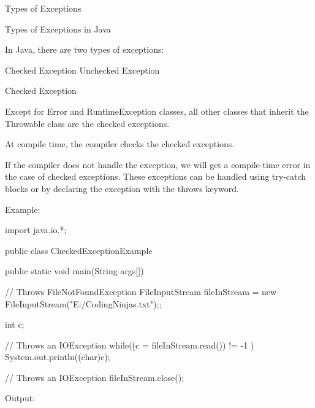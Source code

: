  
 
 Types of Exceptions
 

 

Types of Exceptions in Java
 

In Java, there are two types of exceptions: 

Checked Exception
Unchecked Exception
 

Checked Exception
 

Except for Error and RuntimeException classes, all other classes that inherit the Throwable class are the checked exceptions.

At compile time, the compiler checks the checked exceptions.

If the compiler does not handle the exception, we will get a compile-time error in the case of checked exceptions. These exceptions can be handled using try-catch blocks or by declaring the exception with the throws keyword.


Example:
 

import java.io.*;

public class CheckedExceptionExample {

	public static void main(String args[]){
	
        // Throws FileNotFoundException
		FileInputStream fileInStream = new FileInputStream("E:/CodingNinjas.txt");;
		
		int c;
		
		// Throws an IOException
		while((c = fileInStream.read()) != -1 ){
			System.out.println((char)c);
		}
	 	
		// Throws an IOException
		fileInStream.close();
	}
}
 

Output:
 


